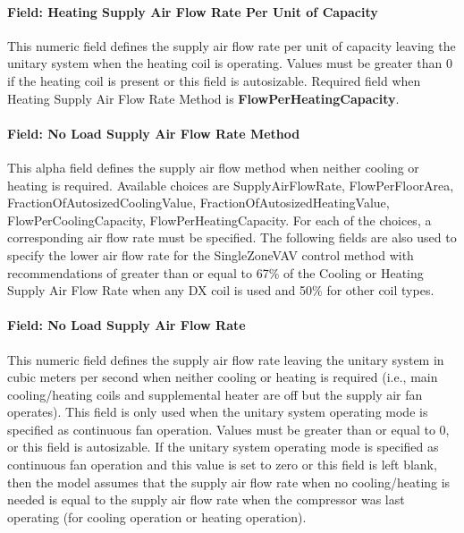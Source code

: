 \paragraph{Field: Heating Supply Air Flow Rate Per Unit of Capacity}\label{field-heating-supply-air-flow-rate-per-unit-of-capacity}

This numeric field defines the supply air flow rate per unit of capacity leaving the unitary system when the heating coil is operating. Values must be greater than 0 if the heating coil is present or this field is autosizable. Required field when Heating Supply Air Flow Rate Method is \textbf{FlowPerHeatingCapacity}.

\paragraph{Field: No Load Supply Air Flow Rate Method}\label{field-no-load-supply-air-flow-rate-method}

This alpha field defines the supply air flow method when neither cooling or heating is required. Available choices are SupplyAirFlowRate, FlowPerFloorArea, FractionOfAutosizedCoolingValue, FractionOfAutosizedHeatingValue, FlowPerCoolingCapacity, FlowPerHeatingCapacity. For each of the choices, a corresponding air flow rate must be specified. The following fields are also used to specify the lower air flow rate for the SingleZoneVAV control method with recommendations of greater than or equal to 67\% of the Cooling or Heating Supply Air Flow Rate when any DX coil is used and 50\% for other coil types.

\paragraph{Field: No Load Supply Air Flow Rate}\label{field-no-load-supply-air-flow-rate-000}

This numeric field defines the supply air flow rate leaving the unitary system in cubic meters per second when neither cooling or heating is required (i.e., main cooling/heating coils and supplemental heater are off but the supply air fan operates). This field is only used when the unitary system operating mode is specified as continuous fan operation. Values must be greater than or equal to 0, or this field is autosizable. If the unitary system operating mode is specified as continuous fan operation and this value is set to zero or this field is left blank, then the model assumes that the supply air flow rate when no cooling/heating is needed is equal to the supply air flow rate when the compressor was last operating (for cooling operation or heating operation).

